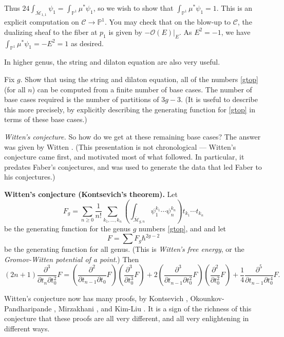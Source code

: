 \documentclass[12pt,letterpaper]{amsart}
\newcommand{\epoint}[1]{\vspace{3mm}\par \noindent \refstepcounter{subsection}{\bf \thesubsection.} 
  {\em #1.} }
\newcommand{\proj}{\mathbb P}
\newcommand{\cC}{{\mathcal{C}}}
\newcommand{\oh}{{\mathcal{O}}}
\newcommand{\cm}{{\mathcal{M}}}
\newcommand{\cmbar}{\overline{\cm}}
\begin{document}
{Thus $24 \int_{\cmbar_{1,1}} \psi_1 = \int_{\proj^1} \mu^* \psi_1$, so
we wish to show that $\int_{\proj^1} \mu^* \psi_1 = 1$.  This is an
explicit computation on $\cC \rightarrow \proj^1$.  You may check that
on the blow-up to $\cC$, the dualizing sheaf to the fiber at $p_1$ is
given by $-\oh(E)|_E$.  As $E^2 = -1$, we have $\int_{\proj^1} \mu^*
\psi_1 = -E^2=1$ as desired.

In higher genus, the string and dilaton equation are also very useful.

  Fix $g$.  Show that using
the string and dilaton equation, all of the numbers \eqref{gtop}
(for all $n$) can be computed from a finite number of base cases.
The number of base cases required is the number of partitions
of $3g-3$.
(It is useful to describe this more precisely, by explicitly
describing the generating function for
\eqref{gtop} in terms of these base cases.)


\epoint{Witten's conjecture}
So how do we get at these remaining base cases?  The answer was
given by Witten \cite{w}.
(This presentation is not chronological --- Witten's conjecture
came first, and motivated most of what followed.  In particular, 
it predates Faber's conjectures, and was used to generate the data that
led Faber to his conjectures.)

\noindent
{\bf Witten's conjecture (Kontsevich's theorem).} 
Let $$F_g = \sum_{n \geq 0} \frac  1 {n!} \sum_{k_1, \dots, k_n} 
\left( \int_{\cmbar_{g,n}} \psi_1^{k_1} \cdots \psi_n^{k_n} \right)
t_{k_1} \cdots t_{k_n}$$
be the generating function for the genus $g$ numbers
\eqref{gtop}, and 
and let $$F = \sum F_g \hbar^{2g-2}$$
be the generating function for all genus.
(This is {\em Witten's free energy}, or the {\em Gromov-Witten
potential of a point}.)
Then
$$
(2n+1) \frac {\partial^3} {\partial t_n \partial t_0^2} F =
\left(  \frac {\partial^2} {\partial t_{n-1} \partial t_0} F \right)
\left( \frac {\partial^3} {\partial t^3_0} F \right)  +
2 \left(  \frac {\partial^3} {\partial t_{n-1} \partial t_0^2} F
\right)  \left( \frac {\partial^2 }  {\partial t_0^2} F \right)
+ \frac 1 4 \frac { \partial^5} {\partial t_{n-1} \partial t_0^4} F.
$$

Witten's conjecture now has many proofs, by Kontsevich \cite{kontsevich},
Okounkov-Pandharipande \cite{op}, Mirzakhani \cite{mirzakhani}, and Kim-Liu \cite{kimliu}.
It is a sign of the richness of this conjecture that these proofs
are all very different, and all very enlightening in different ways.

}
\end{document}
